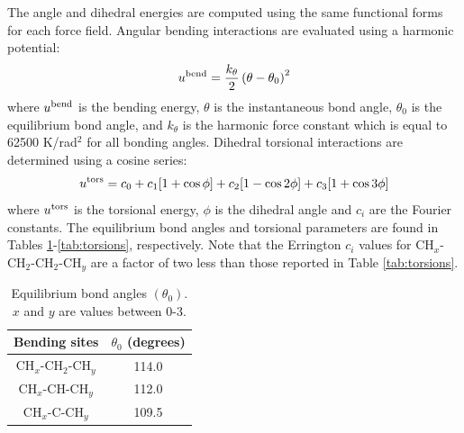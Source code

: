 \documentclass[preprint,review,12pt]{elsarticle}
\begin{document}
The angle and dihedral energies are computed using the same functional forms for each force field. Angular bending interactions are evaluated using a harmonic potential:
\begin{equation}
u^{\rm bend} = \frac{k_\theta}{2} \left(\theta-\theta_0\right)^2
\end{equation}
where $u^{\rm bend}$ is the bending energy, $\theta$ is the instantaneous bond angle, $\theta_0$ is the equilibrium bond angle, and $k_\theta$ is the harmonic force constant which is equal to 62500 K/rad$^2$ for all bonding angles. Dihedral torsional interactions are determined using a cosine series:
\begin{equation}
u^{\rm tors} = c_0 + c_1 [1+\cos{\phi}] + c_2 [1-\cos{2\phi}] + c_3 [1+\cos{3\phi}]
\end{equation}
where $u^{\rm tors}$ is the torsional energy, $\phi$ is the dihedral angle and $c_i$ are the Fourier constants. The equilibrium bond angles and torsional parameters are found in Tables \ref{tab:angles}-\ref{tab:torsions}, respectively. Note that the Errington $c_i$ values \cite{Exp6} for CH$_x$-CH$_2$-CH$_2$-CH$_y$ are a factor of two less than those reported in Table \ref{tab:torsions}. 
\begin{table}[h!]
	\caption{Equilibrium bond angles $(\theta_0)$. $x$ and $y$ are values between 0-3.} \label{tab:angles}
	\begin{center}%
		\begin{tabular}{|c|c|}
			\hline
			Bending sites & $\theta_0$ (degrees) \\ \hline
			CH$_x$-CH$_2$-CH$_y$ & 114.0 \\ 
			CH$_x$-CH-CH$_y$ & 112.0 \\ 
			CH$_x$-C-CH$_y$ & 109.5 \\  
			\hline
		\end{tabular}
	\end{center} 
\end{table}
\end{document}
